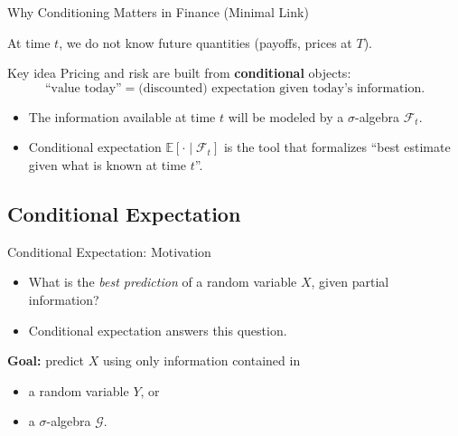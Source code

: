\documentclass[10pt,aspectratio=169]{beamer}
\begin{document}
\begin{frame}{Why Conditioning Matters in Finance (Minimal Link)}

At time \(t\), we do not know future quantities (payoffs, prices at \(T\)).\pause

\medskip
\begin{block}{Key idea}
Pricing and risk are built from \textbf{conditional} objects:
\[
\text{``value today''} = \text{(discounted) expectation given today’s information}.
\]
\end{block}\pause

\medskip
\begin{itemize}
  \item The information available at time \(t\) will be modeled by a \(\sigma\)-algebra \(\mathcal{F}_t\).\pause
  \item Conditional expectation \(\mathbb{E}[\cdot\mid \mathcal{F}_t]\) is the tool that formalizes
  ``best estimate given what is known at time \(t\)''.
\end{itemize}

\end{frame}

\subsection{Conditional Expectation}

\begin{frame}{Conditional Expectation: Motivation}

\begin{itemize}
  \item What is the \emph{best prediction} of a random variable \(X\), given partial information?\pause
  \item Conditional expectation answers this question.\pause
\end{itemize}

\medskip
\textbf{Goal:} predict \(X\) using only information contained in\pause
\begin{itemize}
  \item a random variable \(Y\), or\pause
  \item a \(\sigma\)-algebra \(\mathcal{G}\).
\end{itemize}

\end{frame}
\end{document}
